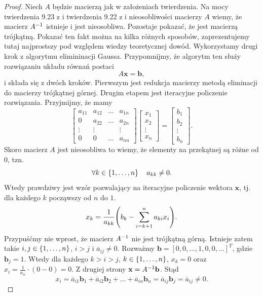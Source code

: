 \documentclass[12pt,a4paper]{report}
\newcommand{\vr}[1]{\mathbf{#1}}
\newcommand{\mx}[1]{{#1}}
\begin{document}
\begin{proof}
Niech $\mx{A}$ będzie macierzą jak w założeniach twierdzenia.
Na mocy twierdzenia 9.23 z \citep{poreda11} i twierdzenia 9.22 z \citep{poreda11} i nieosobliwości macierzy $\mx{A}$ wiemy, że macierz $\inverse{\mx{A}} $ istnieje i jest nieosobliwa. Pozostaje pokazać, że jest macierzą trójkątną. Pokazać ten fakt można na kilka różnych sposobów, zaprezentujemy tutaj najprostszy pod względem wiedzy teoretycznej dowód.
Wykorzystamy drugi krok z algorytmu elimininacji Gaussa. Przypomnijmy, że algorytm ten służy rozwiązaniu układu równań postaci 
$$
\mx{A} \vr{x} = \vr{b},
$$
i składa się z dwóch kroków. Pierwszym jest redukcja macierzy metodą eliminacji do macierzy trójkątnej górnej. Drugim etapem jest iteracyjne policzenie rozwiązania. Przyjmijmy, że mamy
$$
\begin{bmatrix}
a_{11} & a_{12} & \ldots & a_{1n} \\
0 & a_{22} & \ldots & a_{2n} \\
\vdots & \vdots & & \vdots\\
0 & 0 & \ldots & a_{nn}
\end{bmatrix}
\begin{bmatrix}
x_1 \\ x_2 \\ \vdots \\ x_n
\end{bmatrix}
=
\begin{bmatrix}
b_1 \\ b_2 \\ \vdots \\ b_n
\end{bmatrix}.
$$
Skoro macierz $\mx{A}$ jest nieosobliwa to wiemy, że elementy na przekątnej są różne od $0$, tzn.
$$
\forall k \in \left\lbrace {1, \ldots, n} \right\rbrace \quad a_{kk} \neq 0.
$$
Wtedy prawdziwy jest wzór pozwalający na iteracyjne policzenie wektora $\vr{x}$, tj. dla każdego $k$ począwszy od $n$ do $1$.
\begin{equation}
x_k = \frac{1}{a_{kk}} \bracket{b_k - \sum_{i=k+1}^{n} a_{ki} x_{i}}.
\end{equation}
Przypuśćmy nie wprost, że macierz $\inverse{\mx{A}}$ nie jest trójkątną górną. Istnieje zatem takie $i,j \in \left\lbrace {1, \ldots, n} \right\rbrace$, $i > j$ i $\overline{a}_{ij} \neq 0 $. Rozważmy $\vr{b}= [0,0, \ldots, 1,0,0, \ldots]^{T}$, gdzie $\vr{b}_{j} = 1$. Wtedy dla każdego $k>i>j$, $k \in \left\lbrace {1, \ldots, n} \right\rbrace$, $x_{k} = 0$ oraz $x_{i} = \frac{1}{a_{ii}} \cdot(0 - 0 ) = 0$. Z drugiej strony $\vr{x} = \inverse{\mx{A}} \vr{b}$. Stąd 
$$
x_{i} = \overline{a}_{i1} \vr{b}_{1} + \overline{a}_{i2} \vr{b}_{2} + \ldots + \overline{a}_{in} \vr{b}_{n} = \overline{a}_{ij} \vr{b}_{j} = \overline{a}_{ij} \neq 0.
$$
\end{proof}
\end{document}
